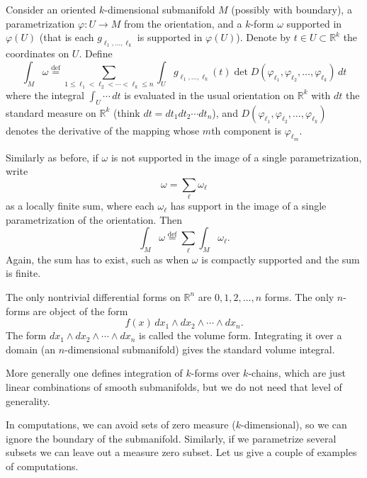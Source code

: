 \documentclass[12pt,openany]{book}
\newcommand{\R}{{\mathbb{R}}}
\theoremstyle{plain}
\theoremstyle{remark}
\theoremstyle{definition}
\theoremstyle{exercise}
\theoremstyle{example}
\begin{document}
Consider
an oriented $k$-dimensional submanifold $M$
(possibly with boundary), a parametrization $\varphi \colon U \to M$
from the orientation,
and a $k$-form $\omega$
supported in $\varphi(U)$ (that is each $g_{\ell_1,\ldots,\ell_k}$ is supported in
$\varphi(U)$).
Denote by $t \in U \subset \R^k$
the coordinates on $U$.  Define
\begin{equation*}
\int_M \omega
\overset{\text{def}}{=}
\sum_{1 \leq \ell_1 < \ell_2 < \cdots < \ell_k \leq n}
\int_U
g_{\ell_1,\ldots,\ell_k}(t)
\det D (\varphi_{\ell_1},\varphi_{\ell_2},\ldots,\varphi_{\ell_k})
\,
dt
\end{equation*}
where the integral $\int_U \cdots\, dt$ is evaluated in the
usual orientation on $\R^k$ with $dt$ the standard
measure on $\R^k$ (think $dt = dt_1 dt_2 \cdots dt_n$), and
$D (\varphi_{\ell_1},\varphi_{\ell_2},\ldots,\varphi_{\ell_k})$
denotes the derivative of the mapping whose $m$th component
is $\varphi_{\ell_m}$.

Similarly as before, if $\omega$ is not supported in the
image of a single parametrization, write
\begin{equation*}
\omega = \sum_{\ell} \omega_\ell
\end{equation*}
as a locally finite sum,
where each $\omega_\ell$ has support in the image of a single
parametrization of the orientation.
Then
\begin{equation*}
\int_M \omega
\overset{\text{def}}{=}
\sum_{\ell}
\int_M \omega_\ell .
\end{equation*}
Again, the sum has to exist, such as when $\omega$ is compactly supported
and the sum is finite.

The only nontrivial differential forms on $\R^n$
are $0,1,2,\ldots,n$ forms.  The only $n$-forms are
object of the form
\begin{equation*}
f(x) \,
dx_1 \wedge dx_2 \wedge \cdots \wedge dx_n .
\end{equation*}
The form $dx_1 \wedge dx_2 \wedge \cdots \wedge dx_n$ is called the
volume form.  Integrating it over a domain (an $n$-dimensional submanifold)
gives the standard volume integral.

More generally one defines integration of $k$-forms over $k$-chains,
which are just linear combinations of smooth submanifolds, but we do not
need that level of generality.

\medskip

In computations, we can avoid sets of zero measure ($k$-dimensional),
so we can ignore the boundary of the submanifold.  Similarly, if we parametrize
several subsets we can leave out a measure zero subset.
Let us give a couple of examples of computations.
\end{document}
